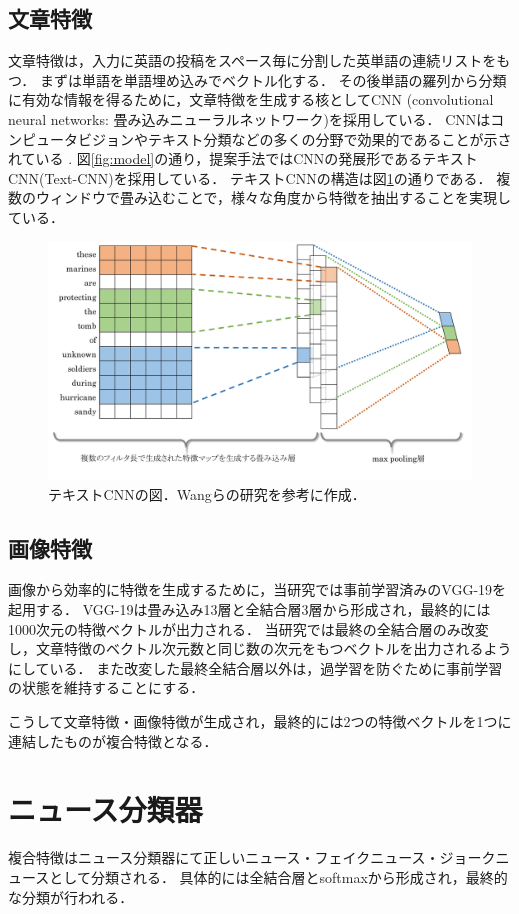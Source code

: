 \subsection{文章特徴}
文章特徴は，入力に英語の投稿をスペース毎に分割した英単語の連続リストをもつ．
まずは単語を単語埋め込みでベクトル化する．
その後単語の羅列から分類に有効な情報を得るために，文章特徴を生成する核としてCNN
(convolutional neural networks: 畳み込みニューラルネットワーク)を採用している．
CNNはコンピュータビジョンやテキスト分類などの多くの分野で効果的であることが示されている
\cite{collobert2011natural,kalchbrenner2014convolutional}.
図\ref{fig:model}の通り，提案手法ではCNNの発展形であるテキストCNN(Text-CNN)\cite{kim2014convolutional}を採用している．
テキストCNNの構造は図\ref{fig:text-cnn}の通りである．
複数のウィンドウで畳み込むことで，様々な角度から特徴を抽出することを実現している．
\begin{figure}[H]
    \centering
    \includegraphics[width=\linewidth]{images/text-cnn.pdf}
    \caption{テキストCNNの図．Wangらの研究\cite{wang2018eann}を参考に作成．}
    \label{fig:text-cnn}
\end{figure}
%
\subsection{画像特徴}
画像から効率的に特徴を生成するために，当研究では事前学習済みのVGG-19\cite{simonyan2014very}を起用する．
VGG-19は畳み込み13層と全結合層3層から形成され，最終的には1000次元の特徴ベクトルが出力される．
当研究では最終の全結合層のみ改変し，文章特徴のベクトル次元数と同じ数の次元をもつベクトルを出力されるようにしている．
また改変した最終全結合層以外は，過学習を防ぐために事前学習の状態を維持することにする．

こうして文章特徴・画像特徴が生成され，最終的には2つの特徴ベクトルを1つに連結したものが複合特徴となる．
%
\section{ニュース分類器}
%
複合特徴はニュース分類器にて正しいニュース・フェイクニュース・ジョークニュースとして分類される．
具体的には全結合層とsoftmaxから形成され，最終的な分類が行われる．




%
%
\newpage
%
%
%
%
%
%
%
%
%
%
% 